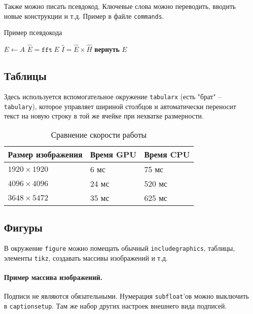 Также можно писать псевдокод. Ключевые слова можно переводить, вводить новые конструкции и т.д. Пример в файле \texttt{commands}.
\begin{algorithm}
    \caption{Пример псевдокода}
    \begin{algorithmic}[1] %
        \State $E \gets A$
        \State $\hat{E} = \texttt{fft}~E$
        \State $\hat{I} = \hat{E}\times \hat{H}$
        \EndFor
        \State \textbf{вернуть} $E$
        \EndProcedure
    \end{algorithmic}
\end{algorithm}

\subsection{Таблицы}
Здесь используется вспомогательное окружение \texttt{tabularx} (есть "брат" -- \texttt{tabulary}), которое управляет шириной столбцов и автоматически переносит текст на новую строку в той же ячейке при нехватке размерности.

\begin{table}[H]
	\centering
	\begin{tabularx}{\textwidth}{| X | X | X |}
		\hline
		\textbf{Размер изображения} & \textbf{Время GPU} & \textbf{Время CPU} \\ \hline
		$1920\times 1920$           & 6 мс               & 75 мс              \\ \hline
		$4096\times 4096$           & 24 мс              & 520 мс             \\ \hline
		$3648\times 5472$           & 35 мс              & 625 мс             \\ \hline
	\end{tabularx}
	\caption{Сравнение скорости работы}
\end{table}

\subsection{Фигуры}
В окружение \texttt{figure} можно помещать обычный \texttt{includegraphics}, таблицы, элементы \texttt{tikz}, создавать массивы изображений и т.д. 

\paragraph{Пример массива изображений.}
Подписи не являются обязательными. Нумерация \texttt{subfloat}'ов можно выключить в \texttt{captionsetup}. Там же набор других настроек внешнего вида подписей.

